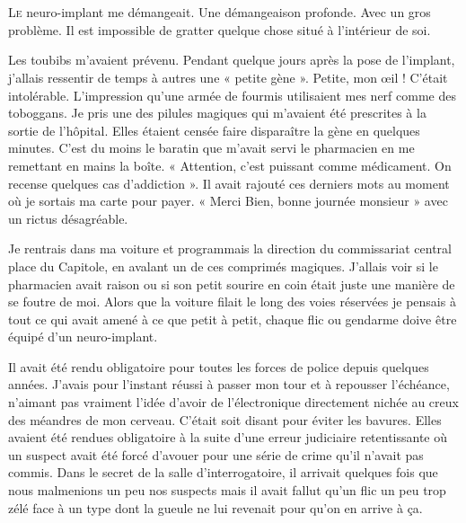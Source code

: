 \chapter{}

\lettrine[lines=1]{L}{e} neuro-implant me démangeait. Une démangeaison profonde.
Avec un gros problème. Il est impossible de gratter quelque chose situé à
l'intérieur de soi.

Les toubibs m'avaient prévenu. Pendant quelque jours après la pose de l'implant,
j'allais ressentir de temps à autres une « petite gène ». Petite, mon œil !
C'était intolérable. L'impression qu'une armée de fourmis utilisaient mes nerf
comme des toboggans. Je pris une des pilules magiques qui m'avaient été
prescrites à la sortie de l'hôpital. Elles étaient censée faire disparaître la
gène en quelques minutes. C'est du moins le baratin que m'avait servi le
pharmacien en me remettant en mains la boîte. « Attention, c'est puissant comme
médicament. On recense quelques cas d'addiction ». Il avait rajouté ces derniers
mots au moment où je sortais ma carte pour payer. « Merci Bien, bonne journée
monsieur » avec un rictus désagréable.

Je rentrais dans ma voiture et programmais la direction du commissariat central
place du Capitole, en avalant un de ces comprimés magiques. J'allais voir si le
pharmacien avait raison ou si son petit sourire en coin était juste une manière
de se foutre de moi. Alors que la voiture filait le long des voies réservées je
pensais à tout ce qui avait amené à ce que petit à petit, chaque flic ou
gendarme doive être équipé d'un neuro-implant.

Il avait été rendu obligatoire pour toutes les forces de police depuis quelques
années. J'avais pour l'instant réussi à passer mon tour et à repousser
l'échéance, n'aimant pas vraiment l'idée d'avoir de l'électronique directement
nichée au creux des méandres de mon cerveau. C'était soit disant pour éviter les
bavures. Elles avaient été rendues obligatoire à la suite d'une erreur
judiciaire retentissante où un suspect avait été forcé d'avouer pour une série
de crime qu'il n'avait pas commis. Dans le secret de la salle d'interrogatoire,
il arrivait quelques fois que nous malmenions un peu nos suspects mais il avait
fallut qu'un flic un peu trop zélé face à un type dont la gueule ne lui revenait
pour qu'on en arrive à ça.

